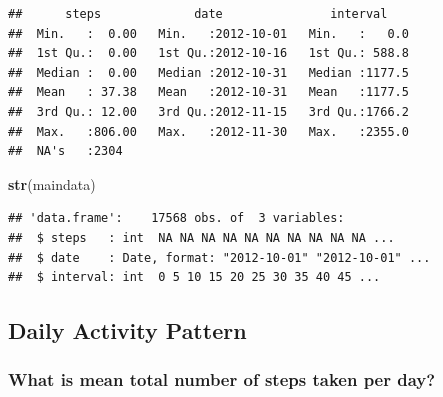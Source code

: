 \documentclass[]{article}
\newenvironment{Shaded}{\begin{snugshade}}{\end{snugshade}}
\newcommand{\KeywordTok}[1]{\textcolor[rgb]{0.13,0.29,0.53}{\textbf{#1}}}
\newcommand{\DataTypeTok}[1]{\textcolor[rgb]{0.13,0.29,0.53}{#1}}
\newcommand{\StringTok}[1]{\textcolor[rgb]{0.31,0.60,0.02}{#1}}
\newcommand{\OtherTok}[1]{\textcolor[rgb]{0.56,0.35,0.01}{#1}}
\newcommand{\OperatorTok}[1]{\textcolor[rgb]{0.81,0.36,0.00}{\textbf{#1}}}
\newcommand{\NormalTok}[1]{#1}
\begin{document}
\begin{Shaded}
\end{Shaded}

\begin{verbatim}
##      steps             date               interval     
##  Min.   :  0.00   Min.   :2012-10-01   Min.   :   0.0  
##  1st Qu.:  0.00   1st Qu.:2012-10-16   1st Qu.: 588.8  
##  Median :  0.00   Median :2012-10-31   Median :1177.5  
##  Mean   : 37.38   Mean   :2012-10-31   Mean   :1177.5  
##  3rd Qu.: 12.00   3rd Qu.:2012-11-15   3rd Qu.:1766.2  
##  Max.   :806.00   Max.   :2012-11-30   Max.   :2355.0  
##  NA's   :2304
\end{verbatim}

\begin{Shaded}
\begin{Highlighting}[]
\KeywordTok{str}\NormalTok{(maindata)}
\end{Highlighting}
\end{Shaded}

\begin{verbatim}
## 'data.frame':    17568 obs. of  3 variables:
##  $ steps   : int  NA NA NA NA NA NA NA NA NA NA ...
##  $ date    : Date, format: "2012-10-01" "2012-10-01" ...
##  $ interval: int  0 5 10 15 20 25 30 35 40 45 ...
\end{verbatim}

\subsection{Daily Activity Pattern}\label{daily-activity-pattern}

\subsubsection{What is mean total number of steps taken per
day?}\label{what-is-mean-total-number-of-steps-taken-per-day}
\end{document}
